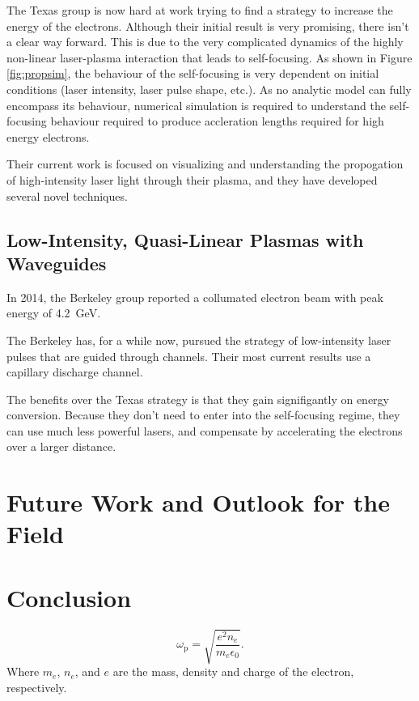 \documentclass[12pt,letter]{article}
\begin{document}
The Texas group is now hard at work trying to find a strategy to increase the
energy of the electrons. Although their initial result is very promising, there
isn't a clear way forward. This is due to the very complicated dynamics of the
highly non-linear laser-plasma interaction that leads to self-focusing. As
shown in Figure \ref{fig:propsim}, the behaviour of the self-focusing is very
dependent on initial conditions (laser intensity, laser pulse shape, etc.). As
no analytic model can fully encompass its behaviour, numerical simulation is
required to understand the self-focusing behaviour required to produce
accleration lengths required for high energy electrons.

Their current work is focused on visualizing and understanding the propogation
of high-intensity laser light through their plasma, and they have developed
several novel techniques.


\subsection{Low-Intensity, Quasi-Linear Plasmas with Waveguides}
In 2014, the Berkeley group reported a collumated electron beam with peak
energy of \SI{4.2}{\giga \electronvolt}.

The Berkeley has, for a while now, pursued the strategy of low-intensity laser
pulses that are guided through channels. Their most current results use a
capillary discharge channel. 

The benefits over the Texas strategy is that they gain signifigantly on energy
conversion. Because they don't need to enter into the self-focusing regime,
they can use much less powerful lasers, and compensate by accelerating the
electrons over a larger distance. 
\section{Future Work and Outlook for the Field}
\section{Conclusion}
    \begin{equation}
        \label{eq:wp}
        \omega_\mathrm{p} = \sqrt{\frac{e^2 n_e}{m_e \epsilon_0}}.
    \end{equation}
    Where $m_e$, $n_e$, and $e$ are the mass, density and charge of the electron, respectively.

\end{document}
